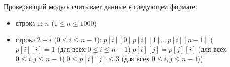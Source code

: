 Проверяющий модуль считывает данные в следующем формате:
\begin{itemize}
\item строка $1$: $n$ ($1 \leq n \leq 1000$)
\item строка $2 + i$ ($0 \leq i \leq n - 1$): $p[i][0]\ p[i][1]\ldots \ p[i][n-1]$ ($p[i][i] = 1$ (для всех $0 \leq i \leq n-1$) $p[i][j] = p[j][i]$ (для всех $0 \leq i, j \leq n-1$) $0 \leq p[i][j] \leq 3$ (для всех $0 \leq i, j \leq n-1$))
\end{itemize}
